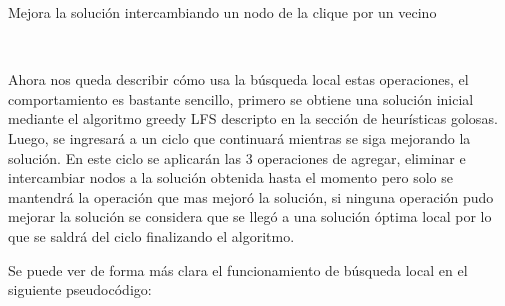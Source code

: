\begin{algorithm}[H]
\begin{algorithmic}
\caption{Mejora la solución intercambiando un nodo de la clique por un vecino}
		\State{}\\
	\EndFunction
\end{algorithmic}
\end{algorithm}

Ahora nos queda describir cómo usa la búsqueda local estas operaciones, el comportamiento es bastante sencillo, primero se obtiene una solución inicial mediante el algoritmo greedy LFS descripto en la sección de heurísticas golosas. Luego, se ingresará a un ciclo que continuará mientras se siga mejorando la solución. En este ciclo se aplicarán las 3 operaciones de agregar, eliminar e intercambiar nodos a la solución obtenida hasta el momento pero solo se mantendrá la operación que mas mejoró la solución, si ninguna operación pudo mejorar la solución se considera que se llegó a una solución óptima local por lo que se saldrá del ciclo finalizando el algoritmo.

Se puede ver de forma más clara el funcionamiento de búsqueda local en el siguiente pseudocódigo:

